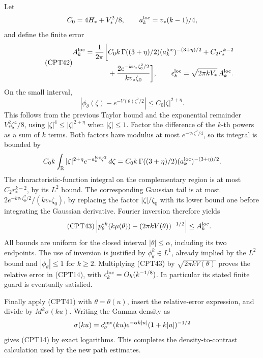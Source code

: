 \documentclass[11pt]{article}
\newcommand{\R}{\mathbb R}
\begin{document}
Let
\[
 C_0=4H_*+V_*^2/8,\qquad a_k^{\rm loc}=v_*(k-1)/4,
\]
and define the finite error
\begin{equation}\tag{CPT42}
\begin{split}
 A_k^{\rm loc}=\frac1{2\pi}\bigg[
 &C_0k\,\Gamma((3+\eta)/2)
                    (a_k^{\rm loc})^{-(3+\eta)/2}
 +C_2r_*^{\,k-2}\\
 &+\frac{2e^{-kv_*\zeta_0^2/2}}{kv_*\zeta_0}
 \bigg],\qquad
 \epsilon_k^{\rm loc}=\sqrt{2\pi kV_*}\,A_k^{\rm loc}.
\end{split}
\end{equation}
On the small interval,
\[
 |\phi_\theta(\zeta)-e^{-V(\theta)\zeta^2/2}|
 \le C_0|\zeta|^{2+\eta}.
\]
This follows from the previous Taylor bound and the exponential
remainder \(V_*^2\zeta^4/8\), using
\(|\zeta|^4\le|\zeta|^{2+\eta}\) when \(|\zeta|\le1\).
Factor the difference of the \(k\)-th powers as a sum of \(k\)
terms.  Both factors have modulus at most
\(e^{-v_*\zeta^2/4}\), so its integral is bounded by
\[
 C_0k\int_\R|\zeta|^{2+\eta}
             e^{-a_k^{\rm loc}\zeta^2}\,d\zeta
 =C_0k\,\Gamma((3+\eta)/2)
                      (a_k^{\rm loc})^{-(3+\eta)/2}.
\]
The characteristic-function integral on the complementary
region is at most \(C_2r_*^{k-2}\), by its \(L^2\) bound.
The corresponding Gaussian tail is at most
\(2e^{-kv_*\zeta_0^2/2}/(kv_*\zeta_0)\), by replacing
the factor \(|\zeta|/\zeta_0\) with its lower bound one
before integrating the Gaussian derivative.
Fourier inversion therefore yields
\begin{equation}\tag{CPT43}
 \left|p_\theta^{*k}(k\mu(\theta))
           -(2\pi kV(\theta))^{-1/2}\right|
 \le A_k^{\rm loc}.
\end{equation}
All bounds are uniform for the closed interval
\(|\theta|\le\alpha\), including its two endpoints.
The use of inversion is justified by
\(\phi_\theta^k\in L^1\), already implied by the \(L^2\)
bound and \(|\phi_\theta|\le1\) for \(k\ge2\).
Multiplying (CPT43) by \(\sqrt{2\pi kV(\theta)}\) proves
the relative error in (CPT14), with
\(\epsilon_k^{\rm loc}=O_h(k^{-1/8})\).
In particular its stated finite guard is eventually satisfied.

Finally apply (CPT41) with \(\theta=\theta(u)\),
insert the relative-error expression, and divide by
\(M^k\sigma(ku)\).  Writing the Gamma density as
\[
 \sigma(ku)=c_{\sigma}^{\rm env}(ku)
                 e^{-\alpha k|u|}(1+k|u|)^{-1/2}
\]
gives (CPT14) by exact logarithms.
This completes the density-to-contrast calculation used by
the new path estimates.
\end{document}
